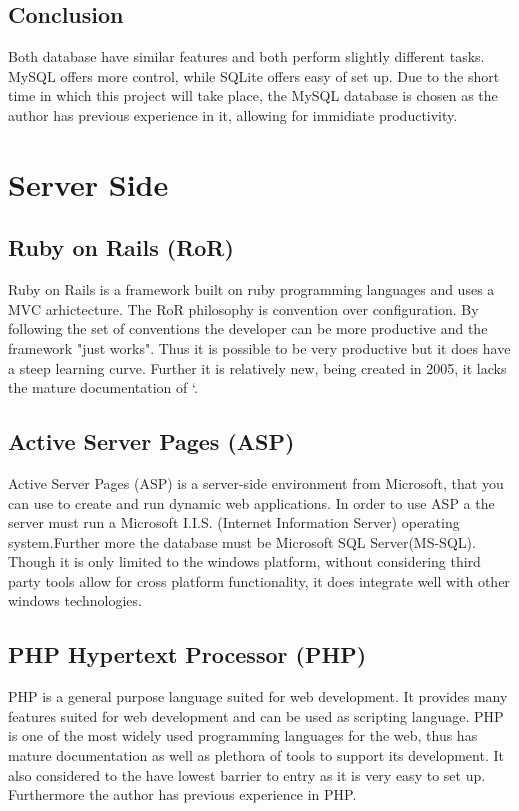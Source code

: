 \documentclass[a4paper,oneside,11pt]{report}
\begin{document}
\subsection{Conclusion}
Both database have similar features and both perform slightly different tasks. MySQL offers more control, while SQLite offers easy of set up. Due to the short time in which this project will take place, the MySQL database is chosen as the author has previous experience in it, allowing for immidiate productivity.

\section{Server Side} 
\subsection{Ruby on Rails (RoR)}  
Ruby on Rails is a framework built on ruby programming languages and uses a MVC arhictecture. The RoR philosophy is convention over configuration. By following the set of conventions the developer can be more productive and the framework "just works". Thus it is possible to be very productive but it does have a steep learning curve. Further it is relatively new, being created in 2005, it lacks the mature documentation of `.

\subsection{ Active Server Pages (ASP)} 
 Active Server Pages (ASP) is a server-side environment from Microsoft, that you can use to create and run dynamic web applications. In order to use ASP a the server must run a Microsoft I.I.S. (Internet Information Server) operating system.Further more the database must be Microsoft SQL Server(MS-SQL). Though it is only limited to the windows platform, without considering third party tools allow for cross platform functionality, it does integrate well with other windows technologies.
 
\subsection{PHP Hypertext Processor (PHP) } 
PHP is a general purpose language suited for web development. It provides many features suited for web development and can be used as scripting language. PHP is one of the most widely used programming languages for the web, thus has mature documentation as well as plethora of tools to support its development. It also considered to the have lowest barrier to entry as it is very easy to set up. Furthermore the author has previous experience in PHP.
\end{document}
